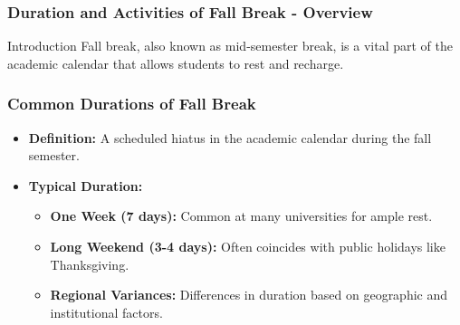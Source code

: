 \documentclass[aspectratio=169]{beamer}
\begin{document}
\begin{frame}[fragile]
    \frametitle{Duration and Activities of Fall Break - Overview}
    \begin{block}{Introduction}
        Fall break, also known as mid-semester break, is a vital part of the academic calendar that allows students to rest and recharge.
    \end{block}
\end{frame}

\begin{frame}[fragile]
    \frametitle{Common Durations of Fall Break}
    \begin{itemize}
        \item \textbf{Definition:} A scheduled hiatus in the academic calendar during the fall semester.
        \item \textbf{Typical Duration:}
        \begin{itemize}
            \item \textbf{One Week (7 days):} Common at many universities for ample rest.
            \item \textbf{Long Weekend (3-4 days):} Often coincides with public holidays like Thanksgiving.
            \item \textbf{Regional Variances:} Differences in duration based on geographic and institutional factors.
        \end{itemize}
    \end{itemize}
\end{frame}
\end{document}
